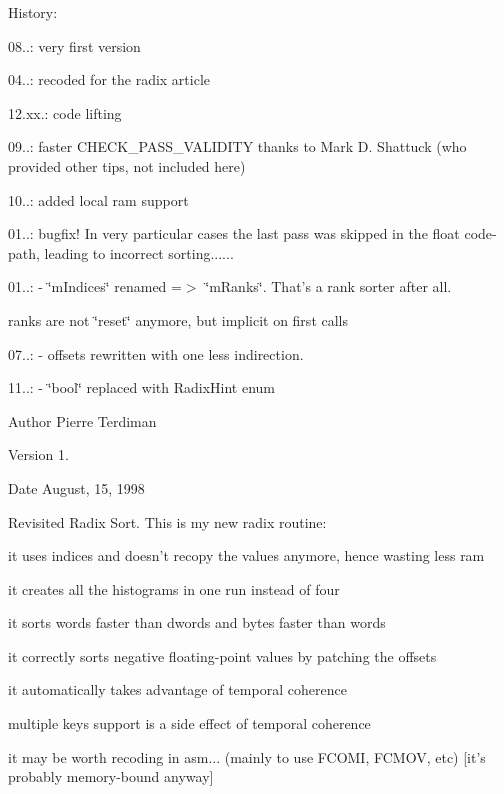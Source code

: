 History\+:
\begin{DoxyItemize}
\item 08..\+: very first version
\item 04..\+: recoded for the radix article
\item 12.\+xx.\+: code lifting
\item 09..\+: faster C\+H\+E\+C\+K\+\_\+\+P\+A\+S\+S\+\_\+\+V\+A\+L\+I\+D\+I\+T\+Y thanks to Mark D. Shattuck (who provided other tips, not included here)
\item 10..\+: added local ram support
\item 01..\+: bugfix! In very particular cases the last pass was skipped in the float code-\/path, leading to incorrect sorting......
\item 01..\+: -\/ \char`\"{}m\+Indices\char`\"{} renamed =$>$ \char`\"{}m\+Ranks\char`\"{}. That's a rank sorter after all.
\begin{DoxyItemize}
\item ranks are not \char`\"{}reset\char`\"{} anymore, but implicit on first calls
\end{DoxyItemize}
\item 07..\+: -\/ offsets rewritten with one less indirection.
\item 11..\+: -\/ \char`\"{}bool\char`\"{} replaced with Radix\+Hint enum
\end{DoxyItemize}

\begin{DoxyAuthor}{Author}
Pierre Terdiman 
\end{DoxyAuthor}
\begin{DoxyVersion}{Version}
1. 
\end{DoxyVersion}
\begin{DoxyDate}{Date}
August, 15, 1998
\end{DoxyDate}
Revisited Radix Sort. This is my new radix routine\+:
\begin{DoxyItemize}
\item it uses indices and doesn't recopy the values anymore, hence wasting less ram
\item it creates all the histograms in one run instead of four
\item it sorts words faster than dwords and bytes faster than words
\item it correctly sorts negative floating-\/point values by patching the offsets
\item it automatically takes advantage of temporal coherence
\item multiple keys support is a side effect of temporal coherence
\item it may be worth recoding in asm... (mainly to use F\+C\+O\+M\+I, F\+C\+M\+O\+V, etc) \mbox{[}it's probably memory-\/bound anyway\mbox{]}
\end{DoxyItemize}

